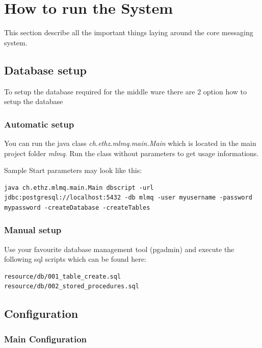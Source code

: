 \documentclass[a4paper]{article}
\begin{document}

\section{How to run the System}

This section describe all the important things laying around the core messaging system.

\subsection{Database setup}

To setup the database required for the middle ware there are 2 option
how to setup the database

\subsubsection{Automatic setup}
You can run the java class \textit{ch.ethz.mlmq.main.Main} which is located in the main project folder \textit{mlmq}. Run the class without parameters to get usage informations.

Sample Start parameters may look like this:

\begin{verbatim} 
java ch.ethz.mlmq.main.Main dbscript -url jdbc:postgresql://localhost:5432 -db mlmq -user myusername -password mypassword -createDatabase -createTables
\end{verbatim}

\subsubsection{Manual setup}
Use your favourite database management tool (pgadmin) and execute the following sql scripts which can be found here:

\begin{verbatim} 
resource/db/001_table_create.sql
resource/db/002_stored_procedures.sql
\end{verbatim}

\subsection{Configuration}

\subsubsection{Main Configuration}
\label{subsub:MainConfig}
\end{document}
